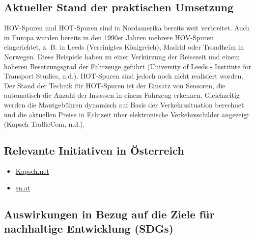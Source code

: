 \documentclass[
]{book}
\providecommand{\tightlist}{%
  \setlength{\itemsep}{0pt}\setlength{\parskip}{0pt}}
\begin{document}
\hypertarget{aktueller-stand-der-praktischen-umsetzung-4}{%
\subsection*{Aktueller Stand der praktischen Umsetzung}\label{aktueller-stand-der-praktischen-umsetzung-4}}

HOV-Spuren und HOT-Spuren sind in Nordamerika bereits weit verbreitet. Auch in Europa wurden bereits in den 1990er Jahren mehrere HOV-Spuren eingerichtet, z. B. in Leeds (Vereinigtes Königreich), Madrid oder Trondheim in Norwegen. Diese Beispiele haben zu einer Verkürzung der Reisezeit und einem höheren Besetzungsgrad der Fahrzeuge geführt (University of Leeds - Institute for Transport Studies, n.d.). HOT-Spuren sind jedoch noch nicht realisiert worden.
Der Stand der Technik für HOT-Spuren ist der Einsatz von Sensoren, die automatisch die Anzahl der Insassen in einem Fahrzeug erkennen. Gleichzeitig werden die Mautgebühren dynamisch auf Basis der Verkehrssituation berechnet und die aktuellen Preise in Echtzeit über elektronische Verkehrsschilder angezeigt (Kapsch TrafficCom, n.d.).

\hypertarget{relevante-initiativen-in-uxf6sterreich-4}{%
\subsection*{Relevante Initiativen in Österreich}\label{relevante-initiativen-in-uxf6sterreich-4}}

\begin{itemize}
\tightlist
\item
  \href{https://www.kapsch.net/ktc/Portfolio/IMS/Congestion/Managed-lanes}{Kapsch.net}
\item
  \href{https://www.sn.at/wirtschaft/oesterreich/kapsch-trafficcom-stellt-sich-breiter-auf-81617200}{sn.at}
\end{itemize}

\hypertarget{auswirkungen-in-bezug-auf-die-ziele-fuxfcr-nachhaltige-entwicklung-sdgs-4}{%
\subsection*{Auswirkungen in Bezug auf die Ziele für nachhaltige Entwicklung (SDGs)}\label{auswirkungen-in-bezug-auf-die-ziele-fuxfcr-nachhaltige-entwicklung-sdgs-4}}
\end{document}
